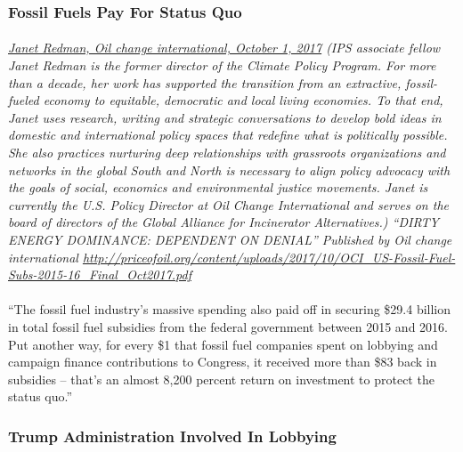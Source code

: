 \documentclass{article}
\begin{document}
\subsubsection{Fossil Fuels Pay For Status Quo}
\paragraph{}
\small
\textit{
\underline{Janet Redman, Oil change international, October 1, 2017}
(IPS associate fellow Janet Redman is the former director of the Climate Policy Program. For more than a decade, her work has supported the transition from an extractive, fossil-fueled economy to equitable, democratic and local living economies. To that end, Janet uses research, writing and strategic conversations to develop bold ideas in domestic and international policy spaces that redefine what is politically possible. She also practices nurturing deep relationships with grassroots organizations and networks in the global South and North is necessary to align policy advocacy with the goals of social, economics and environmental justice movements. Janet is currently the U.S. Policy Director at Oil Change International and serves on the board of directors of the Global Alliance for Incinerator Alternatives.) “DIRTY ENERGY DOMINANCE: DEPENDENT ON DENIAL” Published by Oil change international
\url{http://priceofoil.org/content/uploads/2017/10/OCI_US-Fossil-Fuel-Subs-2015-16_Final_Oct2017.pdf }}
\normalsize

\paragraph{}
``The fossil fuel industry’s massive spending also paid off in securing \$29.4 billion in total fossil fuel subsidies from the federal government between 2015 and 2016. Put another way, for every \$1 that fossil fuel companies spent on lobbying and campaign finance contributions to Congress, it received more than \$83 back in subsidies – that’s an almost 8,200 percent return on investment to protect the status quo.”

\subsubsection{Trump Administration Involved In Lobbying}
\end{document}
